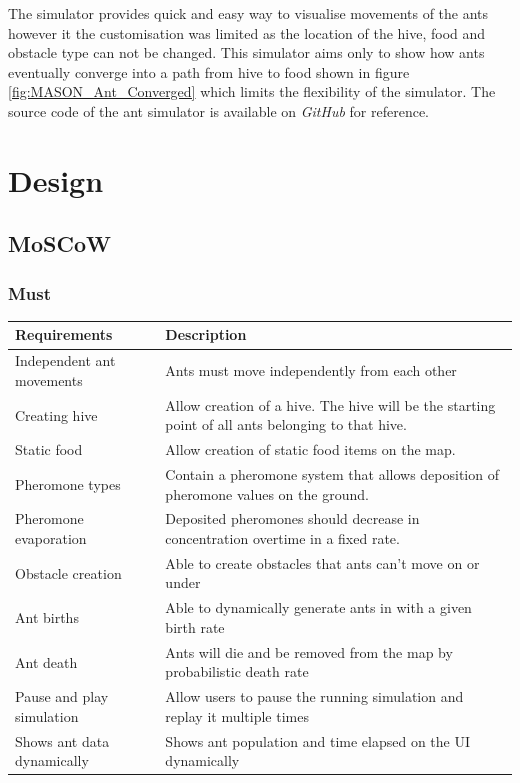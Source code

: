 \documentclass[a4paper, oneside, 11pt]{report}
\begin{document}
The simulator provides quick and easy way to visualise movements of the ants however it the customisation was limited as the location of the hive, food and obstacle type can not be changed. This simulator aims only to show how ants eventually converge into a path from hive to food shown in figure \ref{fig:MASON_Ant_Converged} which limits the flexibility of the simulator. The source code of the ant simulator is available on \textit{GitHub} for reference.

\chapter{Design}
\label{chap:design}
\section{MoSCoW}
\subsection{Must}
\begin{tabular}{|| p{3.5cm} | p{10.5cm} ||} 
	\hline
	Requirements & Description \\
	\hline
	Independent ant movements & Ants must move independently from each other \\
	\hline
	Creating hive & Allow creation of a hive. The hive will be the starting point of all ants belonging to that hive. \\
	\hline
	Static food & Allow creation of static food items on the map. \\
	\hline
	Pheromone types & Contain a pheromone system that allows deposition of pheromone values on the ground. \\
	\hline
	Pheromone evaporation & Deposited pheromones should decrease in concentration overtime in a fixed rate. \\
	\hline
	Obstacle creation & Able to create obstacles that ants can't move on or under \\
	\hline
	Ant births & Able to dynamically generate ants in with a given birth rate \\
	\hline
	Ant death & Ants will die and be removed from the map by probabilistic death rate \\
	\hline
	Pause and play simulation & Allow users to pause the running simulation and replay it multiple times \\
	\hline
	Shows ant data dynamically & Shows ant population and time elapsed on the UI dynamically  \\
	\hline
\end{tabular}
\end{document}
